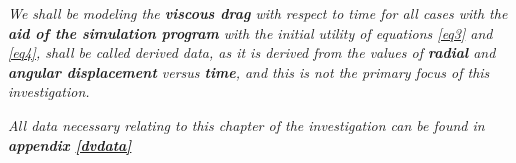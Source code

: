 \textit{We shall be modeling the \textbf{viscous drag} with respect to time for all cases with the \textbf{aid of the simulation program} with the initial utility of equations \ref{eq3} and \ref{eq4}, shall be called derived data, as it is derived from the values of \textbf{radial} and \textbf{angular displacement} versus \textbf{time}, and this is not the primary focus of this investigation.}

\textit{All data necessary relating to this chapter of the investigation can be found in \textbf{appendix \ref{dvdata}}}


